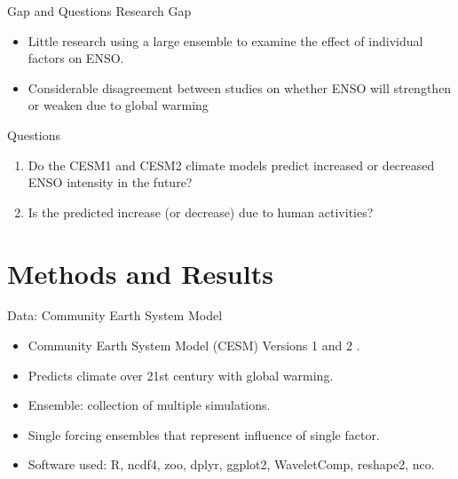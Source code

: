 \documentclass[aspectratio=1610]{beamer}
\begin{document}
\begin{frame}{Gap and Questions}
  \alert{Research Gap}
  \begin{itemize}
  \item Little research using a large ensemble to examine the effect of individual factors on ENSO.
  \item Considerable disagreement between studies on whether ENSO will strengthen or weaken due to global warming
  \end{itemize}
  \alert{Questions}
  \begin{enumerate}
  \item Do the CESM1 and CESM2 climate models predict increased or decreased ENSO intensity in the future?
  \item Is the predicted increase (or decrease) due to human activities?
  \end{enumerate}
\end{frame}

\section{Methods and Results}

\begin{frame}{Data: Community Earth System Model}
  \begin{itemize}
  \item Community Earth System Model (CESM) Versions 1 and 2 \citep{kay2015community} \citep{danabasoglu2020community}.
  \item Predicts climate over 21st century with global warming.
  \item Ensemble: collection of multiple simulations.
  \item Single forcing ensembles that represent influence of single factor.
  \item Software used: R, ncdf4, zoo, dplyr, ggplot2, WaveletComp, reshape2, nco.
  \end{itemize}
\end{frame}
\end{document}
